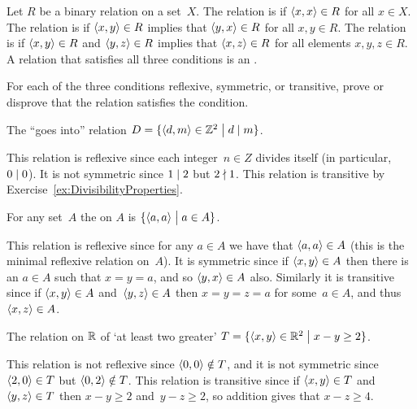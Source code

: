 \documentclass{ibl}  %
\begin{document}
\begin{df} 
Let $R$ be a binary relation on a set~$X$.
The relation is  if $\langle x,x\rangle\in R$ for all $x\in X$.
The relation is  if $\langle x,y\rangle\in R$ implies that
$\langle y,x\rangle\in R$ for all $x,y\in R$.
The relation is  if 
$\langle x,y\rangle\in R$ and $\langle y,z\rangle\in R$ implies that 
$\langle x,z\rangle\in R$ for all elements $x,y,z\in R$.
A relation that satisfies all three conditions is an
.  
\end{df}

\begin{problem} 
  For each of the three conditions reflexive, symmetric, 
  or transitive,
  prove or disprove that the relation satisfies the condition.
\begin{exes}
\begin{exercise} 
  The ``goes into'' relation
  $D=\{\langle d,m\rangle\in\mathbb{Z}^2 \bigm| d\mid m\}$.
\end{exercise}
\begin{answer}
  This relation is reflexive since each integer~$n\in Z$ 
  divides itself (in particular, $0\mid 0$).
  It is not symmetric since $1\mid 2$ but $2\nmid 1$.
  This relation is transitive by Exercise~\ref{ex:DivisibilityProperties}.
\end{answer}
\begin{exercise}
  For any set~$A$ the  on $A$ 
  is $\{\langle a,a\rangle \bigm| a\in A\}$. 
\end{exercise}
\begin{answer}
  This relation is reflexive since for any $a\in A$ we have that
  $\langle a,a\rangle\in A$ (this is the minimal reflexive relation on~$A$).
  It is symmetric since if $\langle x,y\rangle\in A$ then there is an
  $a\in A$ such that $x=y=a$, and so $\langle y,x\rangle\in A$ also.
  Similarly it is transitive since if 
  $\langle x,y\rangle\in A$ and~$\langle y,z\rangle\in A$ then $x=y=z=a$ 
  for some~$a\in A$, and
  thus $\langle x,z\rangle\in A$.
\end{answer}
\begin{exercise}[\midlength]
  The relation on $\mathbb{R}$ of `at least two greater'
  $T=\{\langle x,y\rangle\in \mathbb{R}^2 \bigm| x-y\geq 2\}$.
\end{exercise}
\begin{answer}
  This relation is not reflexive since $\langle0,0\rangle\notin T$,
  and it is not symmetric since $\langle2,0\rangle\in T$ but 
  $\langle0,2\rangle\notin T$.
  This relation is transitive since if $\langle x,y\rangle\in T$ and 
  $\langle y,z\rangle\in T$ 
  then $x-y\geq 2$ and~$y-z\geq 2$, so addition gives that $x-z\geq 4$.
\end{answer}
\end{exes}
\end{problem}
\end{document}
